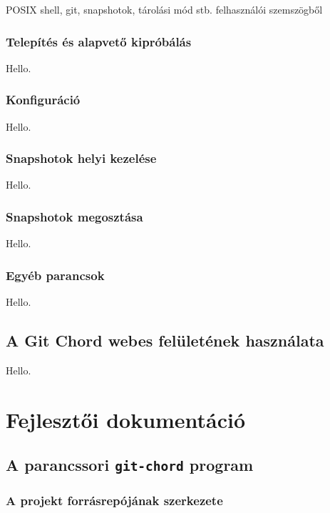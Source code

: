 \documentclass[final]{elteikthesis}[2025/03/25]
\begin{document}
POSIX shell, git, snapshotok, tárolási mód stb. felhasználói szemszögből

\subsection{Telepítés és alapvető kipróbálás}

Hello.

\subsection{Konfiguráció}

Hello.

\subsection{Snapshotok helyi kezelése}

Hello.

\subsection{Snapshotok megosztása}

Hello.

\subsection{Egyéb parancsok}

Hello.

\section{A Git Chord webes felületének használata}

Hello.

\cleardoublepage

\chapter{Fejlesztői dokumentáció}

\section{A parancssori \texttt{git-chord} program}

\subsection{A projekt forrásrepójának szerkezete}
\end{document}
